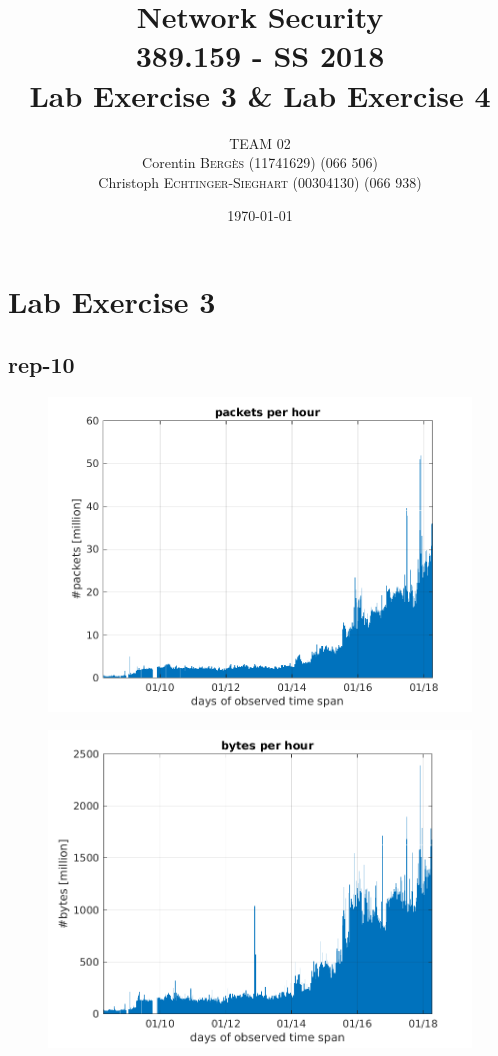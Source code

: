 \documentclass{article}
\title{Network Security \\ 389.159 - SS 2018 \\ Lab Exercise 3 \& Lab Exercise 4} %
\author{
    TEAM 02 \\
    Corentin \textsc{Bergès} (11741629) (066 506) \\
    Christoph \textsc{Echtinger-Sieghart} (00304130) (066 938)
}
\date{\today} %
\begin{document}
\maketitle %
\renewcommand{\arraystretch}{2} %

\section{Lab Exercise 3}

\subsection{rep-10}

\begin{figure}[h]
    \centering
    \includegraphics[scale=.8]{../exercise-3/plots/rep_10_1}
\end{figure}

\begin{figure}[h]
    \centering
    \includegraphics[scale=.8]{../exercise-3/plots/rep_10_2}
\end{figure}
\end{document}
